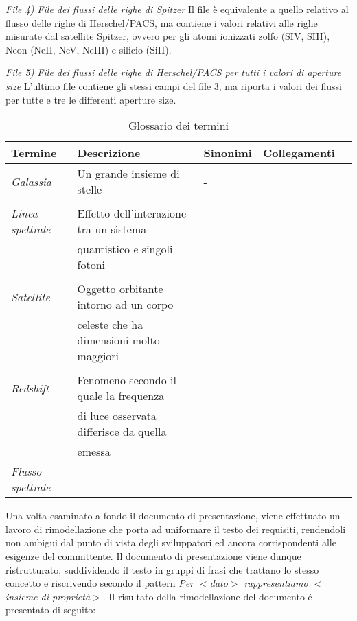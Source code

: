 \documentclass[12pt,a4paper,onecolumn,x11names]{article}
\begin{document}
\begin{flushleft}
		\textit{File 4) File dei flussi delle righe di Spitzer}\newline
		Il file è equivalente a quello relativo al flusso delle righe di Herschel/PACS, ma contiene i valori relativi alle righe misurate dal satellite Spitzer, ovvero per gli atomi ionizzati zolfo (SIV, SIII), Neon (NeII, NeV, NeIII) e silicio (SiII).\newline
		
		\textit{File 5) File dei flussi delle righe di Herschel/PACS per tutti i valori di aperture size}
		L’ultimo file contiene gli stessi campi del file 3, ma riporta i valori dei flussi per tutte e tre le differenti aperture size.\newline
	\end{flushleft}

	\begin{table}[h]
		\centering
		\caption{Glossario dei termini}
		\begin{tabular}{lllll}
			\hline
			\rowcolor[HTML]{66CC99}Termine & Descrizione & Sinonimi & Collegamenti				  \\ \hline
			
			\textit{Galassia}			&	Un grande insieme di stelle					&	-	 &\\
										&												&		 &\\
			\textit{Linea spettrale}	&	Effetto dell'interazione tra un sistema		&  		 &\\
										&   quantistico e singoli fotoni				&	- 	 &\\
										&  					                     		&        &\\
			\textit{Satellite}			& 	Oggetto orbitante intorno ad un corpo		&		 &\\
										& 	celeste che ha dimensioni molto maggiori	&		 &\\
										&												&		 &\\
			\textit{Redshift} 			& 	Fenomeno secondo il quale la frequenza 		&		 &\\
										& 	di luce osservata differisce da quella		&		 &\\
										& 	emessa 										&		 &\\
			\textit{Flusso spettrale}	&												&		 &\\	
		\end{tabular}
	\end{table}

	\begin{flushleft}
		Una volta esaminato a fondo il documento di presentazione, viene effettuato un lavoro di rimodellazione che porta ad uniformare il testo dei requisiti, rendendoli non ambigui dal punto di vista degli sviluppatori ed ancora corrispondenti alle esigenze del committente. Il documento di presentazione viene dunque ristrutturato, suddividendo il testo in gruppi di frasi che trattano lo stesso concetto e riscrivendo secondo il pattern \textit{Per $<$dato$>$ rappresentiamo $<$insieme di proprietà$>$}.\newline
		Il risultato della rimodellazione del documento \'{e} presentato di seguito:
	\end{flushleft}
	
\end{document}
